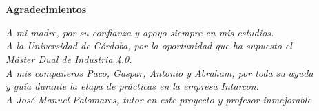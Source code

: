 \chapter*{}

\begin{flushright}
    \Huge{\textbf{Agradecimientos}}
\end{flushright}
\vspace{10mm}
\begin{flushright}
    \textit{A mi madre, por su confianza y apoyo siempre en mis estudios. \\
    A la Universidad de Córdoba, por la oportunidad que ha supuesto el \\ Máster Dual de Industria 4.0. \\
    A mis compañeros Paco, Gaspar, Antonio y Abraham, por toda su ayuda \\ y guía durante la etapa de prácticas en la empresa Intarcon. \\
    A José Manuel Palomares, tutor en este proyecto y profesor inmejorable.}
\end{flushright}